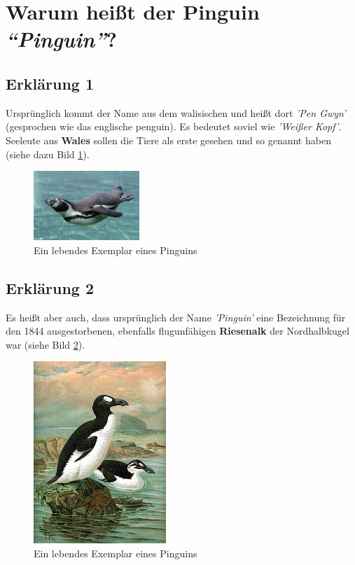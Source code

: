 \documentclass[a4paper, pdftex, ngerman, 11pt]{article}
\begin{document}
\section{Warum heißt der Pinguin \emph{"`Pinguin"'}?}
\subsection{Erklärung 1}
Ursprünglich kommt der Name aus dem walisischen und heißt dort \emph{'Pen Gwyn'} (gesprochen wie das englische penguin). Es bedeutet soviel wie \emph{'Weißer Kopf'}. Seeleute aus \textbf{Wales} sollen die Tiere als erste gesehen und so genannt haben (siehe dazu Bild \ref{img:pen}).

\begin{figure}[H]
	\begin{center}
		\includegraphics[width=4cm]{bilder/swim-Ping.jpg}
		\caption{Ein lebendes Exemplar eines Pinguins}
		\label{img:pen}
	\end{center}
\end{figure}

\subsection{Erklärung 2}
Es heißt aber auch, dass ursprünglich der Name \emph{'Pinguin'} eine Bezeichnung für den 1844 ausgestorbenen, ebenfalls flugunfähigen \textbf{Riesenalk} der Nordhalbkugel war (siehe Bild \ref{img:auk}).

\begin{figure}[H]
\begin{center}
\includegraphics[width=5cm]{bilder/GreatAuk.jpg}
\caption{Ein lebendes Exemplar eines Pinguins}
\label{img:auk}
\end{center}
\end{figure}
\end{document}
